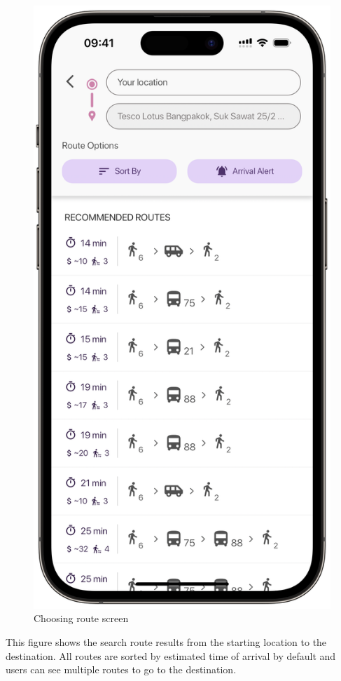 \newpage
\begin{figure}[!h]
	\centering
	\includegraphics[width=0.5\linewidth]{chapter4/choosing_route_screen.png}
	\caption{Choosing route screen}
	\label{fig:Choosing route screen}
\end{figure}
This figure shows the search route results from the starting location to the destination. All routes are sorted by estimated time of arrival by default and users can see multiple routes to go to the destination.

